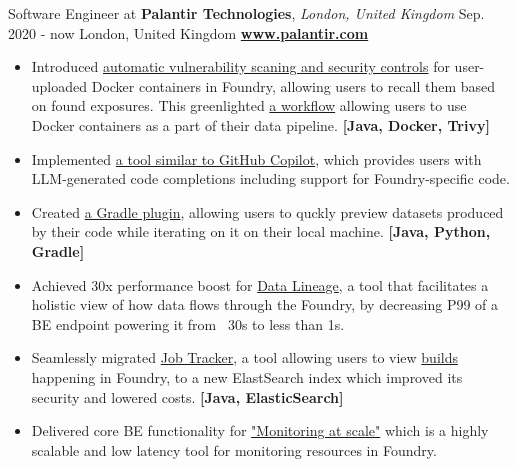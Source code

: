\cveventflat
{Software Engineer at }
{\textbf{Palantir Technologies}, \textit{London, United Kingdom}}
{Sep. 2020 - now}
{London, United Kingdom}
\newline
\href{https://www.palantir.com/}{\textbf{www.palantir.com}}
\begin{itemize}
    \item {
        Introduced
        \href{https://www.palantir.com/docs/foundry/administration/container-governance/}{automatic vulnerability scaning and security controls}
        for user-uploaded Docker containers in Foundry, allowing users to recall them based on found exposures.
        This greenlighted
        \href{https://www.palantir.com/docs/foundry/transforms-python/container-overview/}{a workflow}
        allowing users to use Docker containers as a part of their data pipeline.
    }
    \textbf{[Java, Docker, Trivy]}
    \item {
        Implemented
        \href{https://www.palantir.com/docs/foundry/code-repositories/aip-features/#code-autocomplete}{a tool similar to GitHub Copilot},
        which provides users with LLM-generated code completions including support for Foundry-specific code.
    }
    \item {
        Created
        \href{https://www.palantir.com/docs/foundry/transforms-common/local-preview/}{a Gradle plugin},
        allowing users to quckly preview datasets produced by their code while iterating on it on their local machine.
    }
    \textbf{[Java, Python, Gradle]}
    \item {
        Achieved 30x performance boost for
        \href{https://www.palantir.com/docs/foundry/data-lineage/overview/}{Data Lineage},
        a tool that facilitates a holistic view of how data flows through the Foundry,
        by decreasing P99 of a BE endpoint powering it from ~30s to less than 1s.
    }
    \item {
        Seamlessly migrated
        \href{https://www.palantir.com/docs/foundry/data-integration/application-reference/#builds}{Job Tracker},
        a tool allowing users to view
        \href{https://www.palantir.com/docs/foundry/data-integration/builds/}{builds}
        happening in Foundry, to a new ElastSearch index which improved its security and lowered costs.
    }
    \textbf{[Java, ElasticSearch]}
    \item {
        Delivered core BE functionality for
        \href{https://www.palantir.com/docs/foundry/maintaining-pipelines/monitoring-views-intro/}{"Monitoring at scale"}
        which is a highly scalable and low latency tool for monitoring resources in Foundry.
}
\end{itemize}
